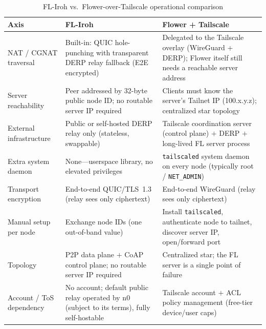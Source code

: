 \documentclass[a4paper,fleqn]{cas-dc}
\begin{document}
\begin{table}[t]
\centering
\caption{FL-Iroh vs.\ Flower-over-Tailscale operational comparison}
\label{tab:e7}
\footnotesize
\renewcommand{\arraystretch}{1.25}
\setlength{\tabcolsep}{4pt}
\begin{tabular}{p{2.4cm} p{6.2cm} p{6.2cm}}
\toprule
\textbf{Axis} & \textbf{FL-Iroh} & \textbf{Flower + Tailscale} \\
\midrule
NAT / CGNAT traversal & Built-in: QUIC hole-punching with transparent DERP relay fallback (E2E encrypted) & Delegated to the Tailscale overlay (WireGuard + DERP); Flower itself still needs a reachable server address \\
Server reachability & Peer addressed by 32-byte public node ID; no routable server IP required & Clients must know the server's Tailnet IP (100.x.y.z); centralized star topology \\
External infrastructure & Public or self-hosted DERP relay only (stateless, swappable) & Tailscale coordination server (control plane) $+$ DERP $+$ long-lived FL server process \\
Extra system daemon & None---userspace library, no elevated privileges & \texttt{tailscaled} system daemon on every node (typically root / \texttt{NET\_ADMIN}) \\
Transport encryption & End-to-end QUIC/TLS~1.3 (relay sees only ciphertext) & End-to-end WireGuard (relay sees only ciphertext) \\
Manual setup per node & Exchange node IDs (one out-of-band value) & Install \texttt{tailscaled}, authenticate node to tailnet, discover server IP, open/forward port \\
Topology & P2P data plane $+$ CoAP control plane; no routable server IP required & Centralized star; the FL server is a single point of failure \\
Account / ToS dependency & No account; default public relay operated by n0 (subject to its terms), fully self-hostable & Tailscale account $+$ ACL policy management (free-tier device/user caps) \\
\bottomrule
\end{tabular}
\end{table}
\end{document}
